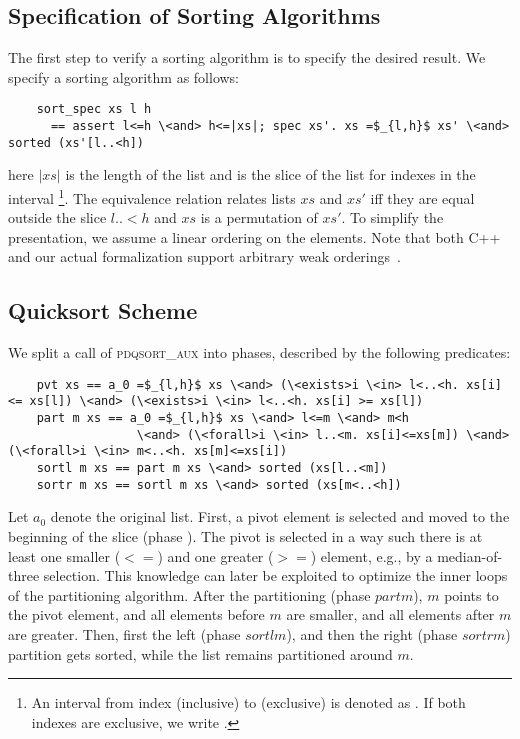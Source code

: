 \documentclass[runningheads]{llncs}
\begin{document}
  \subsection{Specification of Sorting Algorithms}\label{sec:sortspec}
  The first step to verify a sorting algorithm is to specify the desired result.
  We specify a sorting algorithm as follows:
  \begin{lstlisting}
    sort_spec xs l h
      == assert l<=h \<and> h<=|xs|; spec xs'. xs =$_{l,h}$ xs' \<and> sorted (xs'[l..<h])
  \end{lstlisting}
  here \is$|xs|$ is the length of the list  and
   is the slice of the list  for indexes in the interval \footnote{%
    An interval from index  (inclusive) to  (exclusive) is denoted as .
    If both indexes are exclusive, we write .
  }.
  The equivalence relation  relates lists $xs$ and $xs'$ iff they are equal outside the slice \is$l..<h$
  and $xs$ is a permutation of $xs'$.
  To simplify the presentation, we assume a linear ordering on the elements.
  Note that both C++ and our actual formalization support arbitrary weak orderings~\cite{Josu12}.

  \subsection{Quicksort Scheme}
  We split a call of \textsc{pdqsort\_aux} into phases, described by the following predicates:
  \begin{lstlisting}
    pvt xs == a_0 =$_{l,h}$ xs \<and> (\<exists>i \<in> l<..<h. xs[i] <= xs[l]) \<and> (\<exists>i \<in> l<..<h. xs[i] >= xs[l])
    part m xs == a_0 =$_{l,h}$ xs \<and> l<=m \<and> m<h
                  \<and> (\<forall>i \<in> l..<m. xs[i]<=xs[m]) \<and> (\<forall>i \<in> m<..<h. xs[m]<=xs[i])
    sortl m xs == part m xs \<and> sorted (xs[l..<m])
    sortr m xs == sortl m xs \<and> sorted (xs[m<..<h])
  \end{lstlisting}
  Let \is$a_0$ denote the original list. First, a pivot element is selected and moved to the beginning of the slice (phase ).
  The pivot is selected in a way such there is at least one smaller (\is$<=$) and one greater (\is$>=$) element, e.g., by a median-of-three selection.
  This knowledge can later be exploited to optimize the inner loops of the partitioning algorithm.
  After the partitioning (phase \is$part m$), $m$ points to the pivot element, and all elements before $m$ are smaller, and all elements after $m$ are greater.
  Then, first the left (phase \is$sortl m$), and then the right (phase \is$sortr m$) partition gets sorted, while the list remains partitioned around $m$.
\end{document}
